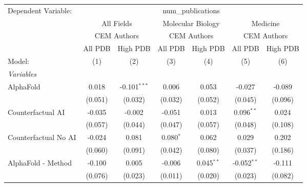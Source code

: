 \begingroup
\centering
\begin{tabular}{lcccccc}
   \tabularnewline \midrule \midrule
   Dependent Variable: & \multicolumn{6}{c}{num\_publications}\\
 & \multicolumn{2}{c}{All Fields} & \multicolumn{2}{c}{Molecular Biology} & \multicolumn{2}{c}{Medicine} \\
\cmidrule(lr){2-3} \cmidrule(lr){4-5} \cmidrule(lr){6-7}
 & \multicolumn{2}{c}{CEM Authors} & \multicolumn{2}{c}{CEM Authors} & \multicolumn{2}{c}{CEM Authors} \\
\cmidrule(lr){2-3} \cmidrule(lr){4-5} \cmidrule(lr){6-7}
 & \multicolumn{1}{c}{All PDB} & \multicolumn{1}{c}{High PDB} & \multicolumn{1}{c}{All PDB} & \multicolumn{1}{c}{High PDB} & \multicolumn{1}{c}{All PDB} & \multicolumn{1}{c}{High PDB} \\
\cmidrule(lr){2-2} \cmidrule(lr){3-3} \cmidrule(lr){4-4} \cmidrule(lr){5-5} \cmidrule(lr){6-6} \cmidrule(lr){7-7}
   Model:                                                     & (1)     & (2)            & (3)           & (4)           & (5)           & (6)\\  
   \midrule
   \emph{Variables}\\
   AlphaFold                                                  & 0.018   & -0.101$^{***}$ & 0.006         & 0.053         & -0.027        & -0.089\\   
                                                              & (0.051) & (0.032)        & (0.032)       & (0.052)       & (0.045)       & (0.096)\\   
   Counterfactual AI                                          & -0.035  & -0.002         & -0.051        & 0.013         & 0.096$^{**}$  & 0.024\\   
                                                              & (0.057) & (0.044)        & (0.047)       & (0.057)       & (0.048)       & (0.108)\\   
   Counterfactual No AI                                       & -0.024  & 0.081          & 0.080$^{*}$   & 0.062         & 0.029         & 0.202\\   
                                                              & (0.060) & (0.091)        & (0.042)       & (0.080)       & (0.037)       & (0.186)\\   
   AlphaFold - Method                                         & -0.100  & 0.005          & -0.006        & 0.045$^{**}$  & -0.052$^{**}$ & -0.111\\   
                                                              & (0.076) & (0.023)        & (0.011)       & (0.020)       & (0.023)       & (0.082)\\   

\end{tabular}
